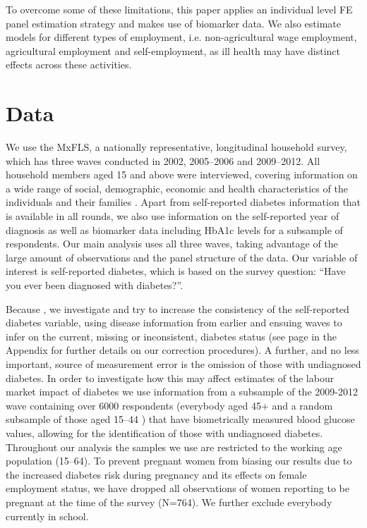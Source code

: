 To overcome some of these limitations, this paper applies an individual level \ac{FE} panel estimation strategy and makes use of biomarker data. We also estimate models for different types of employment, i.e. non-agricultural wage employment, agricultural employment and self-employment, as ill health may have distinct effects across these activities.
\section{\label{sec:Data}Data}

We use the \acf{MxFLS}, a nationally representative, longitudinal household survey, which has three waves conducted in 2002, 2005--2006 and 2009--2012. All household members aged 15 and above were interviewed, covering information on a wide range of social, demographic, economic and health characteristics of the individuals and their families \parencite{Rubalcava2013}. Apart from self-reported diabetes information that is available in all rounds, we also use information on the self-reported year of diagnosis as well as biomarker data including \ac{HbA1c} levels for a subsample of respondents.  Our main analysis uses all three waves, taking advantage of the large amount of observations and the panel structure of the data. Our variable of interest is self-reported diabetes, which is based on the survey question: ``Have you ever been diagnosed with diabetes?''. 

Because \DIFdelbegin {}\DIFdelend \DIFaddbegin {}\DIFaddend , we investigate and try to increase the consistency of the self-reported diabetes variable, using disease information from earlier and ensuing waves to infer on the current, missing or inconsistent, diabetes status (see page \pageref{appendix_cha4_inconsist} in the Appendix for further details on our correction procedures). A further, and no less important, source of measurement error is the omission of those with undiagnosed diabetes. In order to investigate how this may affect estimates of the labour market impact of diabetes we use information from a subsample of the 2009-2012 wave containing over 6000 respondents (everybody aged 45+  and a random subsample of those aged 15--44 \parencite{Crimmins2015}) that have biometrically measured blood glucose values, allowing for the identification of those with undiagnosed diabetes. 
Throughout our analysis the samples we use are restricted to the working age population (15--64). To prevent pregnant women from biasing our results due to the increased diabetes risk during pregnancy and its effects on female employment status, we have dropped all observations of women reporting to be pregnant at the time of the survey (N=764). We further exclude everybody currently in school.

